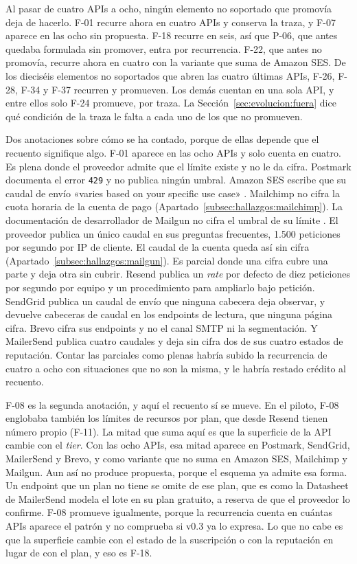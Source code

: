 Al pasar de cuatro APIs a ocho, ningún elemento no soportado que promovía deja de hacerlo.
F-01 recurre ahora en cuatro APIs y conserva la traza, y F-07 aparece en las ocho sin propuesta.
F-18 recurre en seis, así que P-06, que antes quedaba formulada sin promover, entra por recurrencia.
F-22, que antes no promovía, recurre ahora en cuatro con la variante que suma de Amazon SES.
De los dieciséis elementos no soportados que abren las cuatro últimas APIs, F-26, F-28, F-34 y F-37 recurren y promueven.
Los demás cuentan en una sola API, y entre ellos solo F-24 promueve, por traza.
La Sección~\ref{sec:evolucion:fuera} dice qué condición de la traza le falta a cada uno de los que no promueven.

Dos anotaciones sobre cómo se ha contado, porque de ellas depende que el recuento signifique algo.
F-01 aparece en las ocho APIs y solo cuenta en cuatro.
Es plena donde el proveedor admite que el límite existe y no le da cifra.
Postmark documenta el error \texttt{429} y no publica ningún umbral.
Amazon SES escribe que su caudal de envío «varies based on your specific use case» \citep{sesdocs}.
Mailchimp no cifra la cuota horaria de la cuenta de pago (Apartado~\ref{subsec:hallazgos:mailchimp}).
La documentación de desarrollador de Mailgun no cifra el umbral de su límite \citep{mailgundocs}.
El proveedor publica un único caudal en sus preguntas frecuentes, 1.500 peticiones por segundo por IP de cliente.
El caudal de la cuenta queda así sin cifra (Apartado~\ref{subsec:hallazgos:mailgun}).
Es parcial donde una cifra cubre una parte y deja otra sin cubrir.
Resend publica un \textit{rate} por defecto de diez peticiones por segundo por equipo y un procedimiento para ampliarlo bajo petición.
SendGrid publica un caudal de envío que ninguna cabecera deja observar, y devuelve cabeceras de caudal en los endpoints de lectura, que ninguna página cifra.
Brevo cifra sus endpoints y no el canal SMTP ni la segmentación.
Y MailerSend publica cuatro caudales y deja sin cifra dos de sus cuatro estados de reputación.
Contar las parciales como plenas habría subido la recurrencia de cuatro a ocho con situaciones que no son la misma, y le habría restado crédito al recuento.

F-08 es la segunda anotación, y aquí el recuento sí se mueve.
En el piloto, F-08 englobaba también los límites de recursos por plan, que desde Resend tienen número propio (F-11).
La mitad que suma aquí es que la superficie de la API cambie con el \textit{tier}.
Con las ocho APIs, esa mitad aparece en Postmark, SendGrid, MailerSend y Brevo, y como variante que no suma en Amazon SES, Mailchimp y Mailgun.
Aun así no produce propuesta, porque el esquema ya admite esa forma.
Un endpoint que un plan no tiene se omite de ese plan, que es como la Datasheet de MailerSend modela el lote en su plan gratuito, a reserva de que el proveedor lo confirme.
F-08 promueve igualmente, porque la recurrencia cuenta en cuántas APIs aparece el patrón y no comprueba si v0.3 ya lo expresa.
Lo que no cabe es que la superficie cambie con el estado de la suscripción o con la reputación en lugar de con el plan, y eso es F-18.

